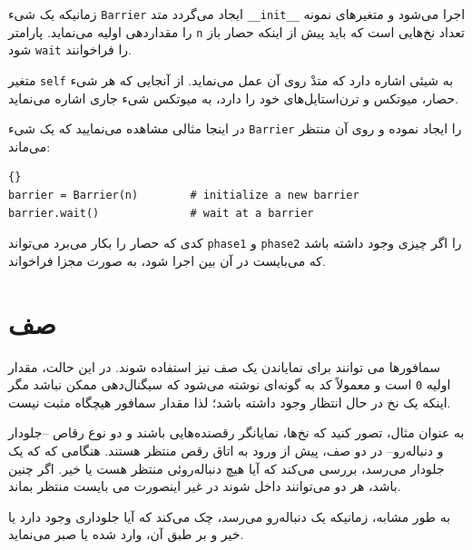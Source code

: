 \documentclass{book}
\begin{document}
    زمانیکه یک شیء \texttt{Barrier} ایجاد می‌گردد 
    متد \texttt{\_\_init\_\_} اجرا می‌شود و متغیرهای نمونه را مقداردهی اولیه می‌نماید. 
    پارامتر \texttt{n} تعداد نخ‌هایی است که باید پیش از اینکه حصار باز شود \texttt{wait}  را فراخوانند. 
    

    متغیر \texttt{self} به شیئی اشاره دارد که متدْ روی آن عمل می‌نماید. 
    از آنجایی که هر شیء حصار، میوتکس و ترن‌استایل‌های خود را دارد،  به میوتکس شیء جاری اشاره می‌نماید. 

    در اینجا مثالی مشاهده می‌نمایید که یک شیء \texttt{Barrier} را ایجاد نموده و روی آن منتظر می‌ماند:

\begin{latin}
\begin{lstlisting}[title={Barrier \rl{واسط}}]{}
barrier = Barrier(n)        # initialize a new barrier
barrier.wait()              # wait at a barrier
\end{lstlisting}
\end{latin}

        کدی که حصار را بکار می‌برد می‌تواند \texttt{phase1} و \texttt{phase2} را 
        اگر چیزی وجود داشته باشد که می‌بایست در آن بین اجرا شود، به صورت مجزا فراخواند. 


\section{صف}
\label{dancers}

    سمافور‌ها می توانند برای نمایاندن یک صف نیز استفاده شوند. 
    در این حالت، مقدار اولیه \texttt{0} است
    و معمولاً کد به گونه‌ای  نوشته می‌شود که سیگنال‌دهی ممکن نباشد 
    مگر اینکه یک نخ در حال انتظار وجود داشته باشد؛ لذا مقدار سمافور هیچگاه مثبت نیست.

    به عنوان مثال، تصور کنید که نخ‌ها، نمایانگر رقصنده‌هایی باشند و دو نوع رقاص --جلودار و  دنباله‌رو--
    در دو صف، پیش از ورود به اتاق رقص منتظر هستند. 
    هنگامی که که یک جلودار می‌رسد، بررسی می‌کند که آیا هیچ دنباله‌روئی منتظر هست یا خیر. 
    اگر چنین باشد، هر دو می‌توانند داخل شوند در غیر اینصورت می بایست منتظر بماند.

    به طور مشابه، زمانیکه یک دنباله‌رو می‌رسد، چک می‌کند که آیا جلوداری وجود دارد یا خیر و بر طبق آن،  وارد شده یا صبر می‌نماید. 
\end{document}

